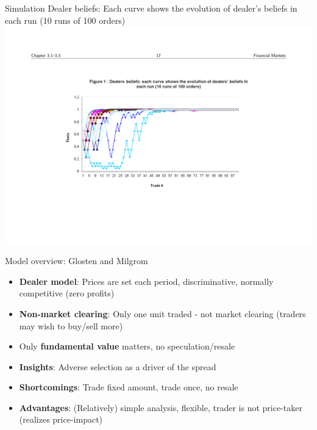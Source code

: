 \begin{frame}{Simulation}
	Dealer beliefs: Each curve shows the evolution of dealer's beliefs in each run (10 runs of 100 orders)
	\quad
	\center
	\includegraphics[width=1\linewidth]{pics/DealerBeliefs_Image.pdf}
\end{frame}


\begin{frame}{Model overview: Glosten and Milgrom}
	\begin{itemize}
		\item \textbf{Dealer model}: Prices are set each period, discriminative, normally competitive (zero profits)
		\item \textbf{Non-market clearing}: Only one unit traded  - not market clearing (traders may wish to buy/sell more)
		\item Only \textbf{fundamental value} matters,  no speculation/resale
	\end{itemize}
	\begin{itemize}
		\item \textbf{Insights}: Adverse selection as a driver of the spread
		\item \textbf{Shortcomings}: Trade fixed amount, trade once, no resale
		\item \textbf{Advantages}: (Relatively) simple analysis, flexible, trader is not price-taker (realizes price-impact)
	\end{itemize}
\end{frame}


